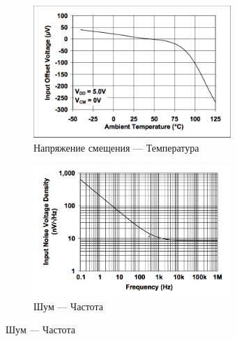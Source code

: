 \documentclass[../paper.tex]{subfiles}
\begin{document}
\begin{figure}[H]
\begin{subfigure}{0.5\textwidth}
\includegraphics[width=0.9\linewidth, height=5cm]{images/op-amp-plot1.png} 
\caption{Напряжение смещения --- Температура}
\end{subfigure}
\begin{subfigure}{0.5\textwidth}
\includegraphics[width=0.9\linewidth, height=5cm]{images/op-amp-plot2.png}
\caption{Шум --- Частота}
\end{subfigure}
\end{figure}
\end{document}
